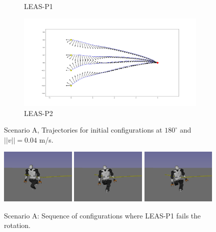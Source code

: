 \begin{figure}[H]
\begin{subfigure}[t]{0.49\linewidth}
    \caption{LEAS-P1}
    \end{subfigure}
    \begin{subfigure}[t]{0.49\linewidth}
    \includegraphics[width=\textwidth]{Figures/Chapter_CPSB/rotation_p2_180_v04.png}
    \caption{LEAS-P2}
    \end{subfigure}
    \caption{Scenario A, Trajectories for initial configurations at $180^{\circ}$ and $||v||=0.04$ m/s.}
    \label{fig:cp-sb:rotation_scenario}
\end{figure}
\begin{figure}[H]
    \captionsetup[subfigure]{justification=centering}
    \centering
    \includegraphics[trim={2cm 2cm 4cm 2cm}, clip,width=0.32\textwidth]{Figures/Chapter_CPSB/rotation_seq/rot2.png}
    \includegraphics[trim={2cm 2cm 4cm 2cm}, clip,width=0.32\textwidth]{Figures/Chapter_CPSB/rotation_seq/rot3.png}
    \includegraphics[trim={2cm 2cm 4cm 2cm}, clip,width=0.32\textwidth]{Figures/Chapter_CPSB/rotation_seq/rot4.png}
    \caption{Scenario A: Sequence of configurations where LEAS-P1 fails the rotation.}
    \label{fig:cp-sb:rotation_leas_p1_fail}
\end{figure}

